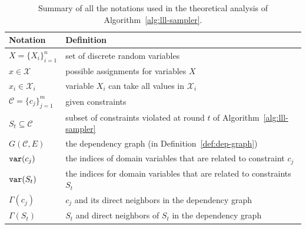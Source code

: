 \begin{table}[!t]
    \tiny
    \centering
    \caption{Summary of all the notations used in the theoretical analysis of Algorithm~\ref{alg:lll-sampler}.}\label{tab:quantifier}
    \begin{tabular}{ll}
        \hline
        Notation                                         & Definition                                                                                   \\
        \hline
        $X=\{X_i\}_{i=1}^n$                              & set of discrete random variables                                                             \\
        \hline
        $x\in\mathcal{X}$                                & possible assignments for variables $X$                                                       \\
        \hline
        $x_i\in\mathcal{X}_i$                            & variable $X_i$ can take all values in $\mathcal{X}_i$                                        \\
        \hline
        $\mathcal{C}=\{c_j\}_{j=1}^{m}$                  & given constraints                                                                            \\
        \hline
        $S_t\subseteq\mathcal{C}$                        & subset of constraints violated at round  $t$ of Algorithm~\ref{alg:lll-sampler}              \\
        \hline
        $G(\mathcal{C},E)$                               & the dependency graph (in Definition~\ref{def:dep-graph})                                     \\
        \hline
        $\mathtt{var}(c_j)$                                      & the indices of domain variables that are related to constraint $c_j$                         \\
        \hline
        $\mathtt{var}(S_t)$                                      & the indices for domain variables that are related to constraints $S_t$                       \\
        \hline
        $\Gamma(c_j)$                                    & $c_j$ and its direct neighbors in the dependency graph                                       \\
        \hline
        $\Gamma(S_t)$                                    & $S_t$ and direct neighbors of $S_t$ in the      dependency graph                             \\
        \hline

\end{tabular}
\end{table}
